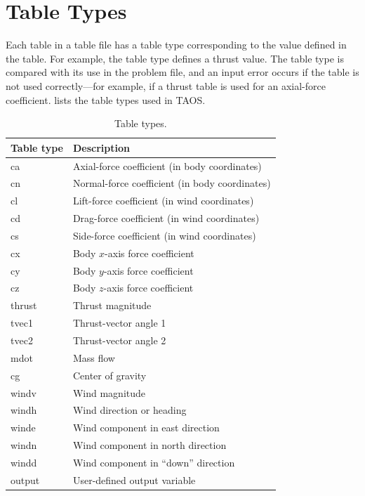 \section{Table Types}\label{sec:table-types}

Each table in a table file has a table type corresponding to the value defined in the
table. For example, the  table type defines a thrust value. The table
type is compared with its use in the problem file, and an input error occurs if the
table is not used correctly---for example, if a thrust table is used for an axial-force
coefficient.  lists the table types used in TAOS.

\begin{table}[htbp]
  \centering
  \caption{Table types.}
  \label{tab:table-types}
  \begin{tabularx}{0.82\linewidth}{@{}>{\ttfamily}lX@{}}
    \toprule
    \normalfont Table type & Description \\
    \midrule
    ca     & Axial-force coefficient (in body coordinates) \\
    cn     & Normal-force coefficient (in body coordinates) \\
    cl     & Lift-force coefficient (in wind coordinates) \\
    cd     & Drag-force coefficient (in wind coordinates) \\
    cs     & Side-force coefficient (in wind coordinates) \\
    cx     & Body $x$-axis force coefficient \\
    cy     & Body $y$-axis force coefficient \\
    cz     & Body $z$-axis force coefficient \\
    thrust & Thrust magnitude \\
    tvec1  & Thrust-vector angle 1 \\
    tvec2  & Thrust-vector angle 2 \\
    mdot   & Mass flow \\
    cg     & Center of gravity \\
    windv  & Wind magnitude \\
    windh  & Wind direction or heading \\
    winde  & Wind component in east direction \\
    windn  & Wind component in north direction \\
    windd  & Wind component in ``down'' direction \\
    output & User-defined output variable \\
    \bottomrule
  \end{tabularx}
\end{table}

